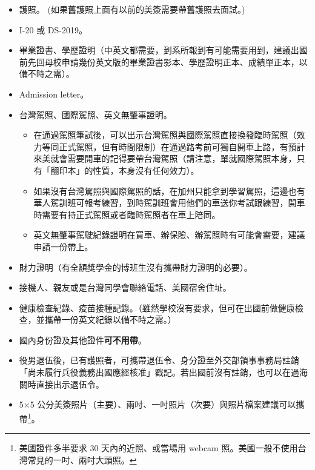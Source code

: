 \documentclass[10pt,a4paper]{book}
\begin{document}
\begin{CJK}{UTF8}{bkai}
\begin{itemize}
\item 護照。 (如果舊護照上面有以前的美簽需要帶舊護照去面試。)
\item I-20 或 DS-2019。
\item 畢業證書、學歷證明（中英文都需要，到系所報到有可能需要用到，建議出國前先回母校申請幾份英文版的畢業證書影本、學歷證明正本、成績單正本，以備不時之需）。
\item Admission letter。
\item 台灣駕照、國際駕照、英文無肇事證明。
	\begin{itemize}
	\item 在通過駕照筆試後，可以出示台灣駕照與國際駕照直接換發臨時駕照（效力等同正式駕照，但有時間限制）在通過路考前可獨自開車上路，有預計來美就會需要開車的記得要帶台灣駕照（請注意，單就國際駕照本身，只有「翻印本」的性質，本身沒有任何效力）。
	\item 如果沒有台灣駕照與國際駕照的話，在加州只能拿到學習駕照，這邊也有華人駕訓班可報考練習，到時駕訓班會用他們的車送你考試跟練習，開車時需要有持正式駕照或者臨時駕照者在車上陪同。
	\item 英文無肇事駕駛紀錄證明在買車、辦保險、辦駕照時有可能會需要，建議申請一份帶上。
	\end{itemize}
\item 財力證明（有全額獎學金的博班生沒有攜帶財力證明的必要）。
\item 接機人、親友或是台灣同學會聯絡電話、美國宿舍住址。
\item 健康檢查紀錄、疫苗接種記錄。（雖然學校沒有要求，但可在出國前做健康檢查，並攜帶一份英文紀錄以備不時之需。）
\item 國內身份證及其他證件\textbf{可不用帶}。
\item 役男退伍後，已有護照者，可攜帶退伍令、身分證至外交部領事事務局註銷「尚未履行兵役義務出國應經核准」戳記。若出國前沒有註銷，也可以在過海關時直接出示退伍令。
\item 5$\times$5 公分美簽照片（主要）、兩吋、一吋照片（次要）與照片檔案建議可以攜帶\footnote{美國證件多半要求 30 天內的近照、或當場用 webcam 照。美國一般不使用台灣常見的一吋、兩吋大頭照。}。
\end{itemize}


\end{CJK}
\end{document}
